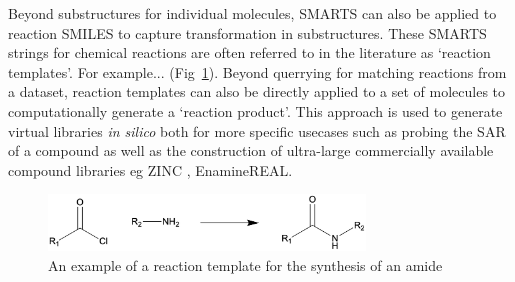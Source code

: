 Beyond substructures for individual molecules, SMARTS can also be applied to reaction SMILES to capture transformation in substructures. These SMARTS strings for chemical reactions are often referred to in the literature as `reaction templates'. For example... (Fig~\ref{fig:rx_template}). Beyond querrying for matching reactions from a dataset, reaction templates can also be directly applied to a set of molecules to computationally generate a `reaction product'. This approach is used to generate virtual libraries \cite{Walters2019libraries, SaldivarGonzalez2020enumeration} \textit{in silico} both for more specific usecases such as probing the SAR of a compound as well as the construction of ultra-large commercially available compound libraries eg ZINC \cite{Irwin2020Zinc}, EnamineREAL.


\begin{figure}[htbp!] 
    \centering    
    \includegraphics[width=0.75\textwidth]{Chapters/Background/Figs/rx_template.png}
    \caption[Reaction template]{An example of a reaction template for the synthesis of an amide}
    \label{fig:rx_template}
\end{figure}

